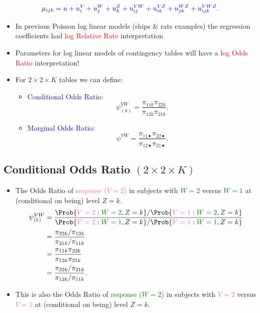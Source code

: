 \documentclass{article}\usepackage[]{graphicx}\usepackage[svgnames]{xcolor}
\providecommand\given{} %
\renewcommand\given{\nonscript\:\delimsize\vert\nonscript\:\mathopen{}}%
\renewcommand\given{\nonscript\:\delimsize\vert\nonscript\:\mathopen{}}%
\renewcommand\given{\nonscript\:\delimsize\vert\nonscript\:\mathopen{}}%
\renewcommand\given{\nonscript\:\delimsize\vert\nonscript\:\mathopen{}}%
\renewcommand\given{\nonscript\:\delimsize\vert\nonscript\:\mathopen{}}%
\renewcommand\given{\nonscript\:\delimsize\vert\nonscript\:\mathopen{}}%
\renewcommand\given{\nonscript\:\delimsize\vert\nonscript\:\mathopen{}}%
\renewcommand\given{\nonscript\:\delimsize\vert\nonscript\:\mathopen{}}%
\renewcommand\given{\nonscript\:\delimsize\vert\nonscript\:\mathopen{}}%
\renewcommand\given{\nonscript\:\delimsize\vert\nonscript\:\mathopen{}}%
\renewcommand\given{\nonscript\:\delimsize\vert\nonscript\:\mathopen{}}%
\let\log\relax%
\renewcommand\given{:}
\begin{document}
\[ \textcolor{Blue}{\log{\mu_{ijk}}=u+u_i^V+u_j^W+u_k^Z+u_{ij}^{VW}+u_{ik}^{VZ}+u_{jk}^{WZ}+u_{ijk}^{VWZ}}. \]
\begin{itemize}
    \item In previous Poisson log linear models (ships \& rats examples) the regression
          coefficients had \textcolor{Red}{log Relative Rate} interpretation
    \item Parameters for log linear models of contingency tables will have a \textcolor{Red}{log Odds Ratio}
          interpretation!
    \item For $ 2\times 2\times K $ tables we can define:
          \begin{itemize}
              \item \textcolor{Blue}{Conditional Odds Ratio}:
                    \[ \psi_{(k)}^{VW}=\frac{\pi_{11k}\pi_{22k}}{\pi_{12k}\pi_{21k}}. \]
              \item \textcolor{Blue}{Marginal Odds Ratio}:
                    \[ \psi^{VW}=\frac{\pi_{11\bullet}\pi_{22\bullet}}{\pi_{12\bullet}\pi_{21\bullet}}. \]
          \end{itemize}
\end{itemize}
\subsection*{Conditional Odds Ratio $(2\times 2\times K)$}
\begin{itemize}
    \item The Odds Ratio of \textcolor{HotPink}{response ($V = 2$)} in subjects with \textcolor{Green}{$ W = 2 $} versus \textcolor{Green}{$ W = 1 $} at
          (conditional on being) level $Z = k$.
          \begin{align*}
              \psi_{(k)}^{VW}
               & =\frac{
                  \Prob{\textcolor{HotPink}{V=2}\given \textcolor{Green}{W=2},Z=k}/\Prob{\textcolor{HotPink}{V=1}\given \textcolor{Green}{W=2},Z=k}
              }{
                  \Prob{\textcolor{HotPink}{V=2}\given \textcolor{Green}{W=1},Z=k}/\Prob{\textcolor{HotPink}{V=1}\given \textcolor{Green}{W=1},Z=k}
              }                                                    \\
               & =\frac{\pi_{22k}/\pi_{12k}}{\pi_{21k}/\pi_{11k}}  \\
               & =\frac{\pi_{11k}\pi_{22k}}{\pi_{12k}\pi_{21k}}    \\
               & =\frac{\pi_{22k}/\pi_{21k}}{\pi_{12k}/\pi_{11k}}.
          \end{align*}
    \item This is also the Odds Ratio of \textcolor{Green}{response ($W = 2$)} in subjects with
          \textcolor{HotPink}{$ V = 2 $} versus \textcolor{HotPink}{$ V = 1 $} at (conditional on being) level $Z = k$.
\end{itemize}
\end{document}
